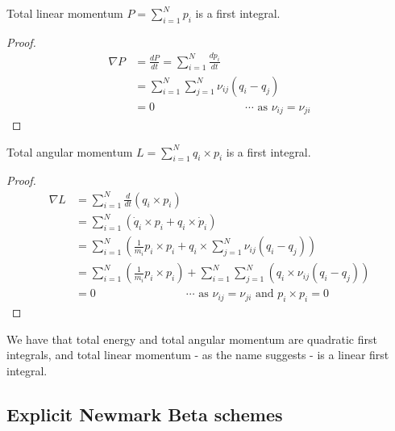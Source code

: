 \documentclass[../Main.tex]{subfiles}
\begin{document}
\begin{theorem} Total linear momentum $P = \sum_{i=1}^{N} p_{i}$ is a first integral. \end{theorem}
\begin{proof}
\begin{align*}
\nabla P & = \frac{dP}{dt} = \sum_{i=1}^{N} \frac{dp_{i}}{dt} \\
&=\sum_{i=1}^{N}\sum_{j=1}^{N}\nu_{ij}\left(q_{i} - q_{j}\right) \\
& = 0 \qquad \qquad \qquad \qquad \cdots \mbox{ as }\nu_{ij} = \nu_{ji}
\end{align*}
\end{proof} 

\begin{theorem} Total angular momentum $L = \sum_{i=1}^{N} q_{i} \times p_{i}$ is a first integral. \end{theorem}
\begin{proof}
\begin{align*}
\nabla L & = \sum_{i=1}^{N} \frac{d}{dt} \left(q_{i} \times p_{i}\right) \\
& = \sum_{i=1}^{N} \left(\dot{q}_{i} \times p_{i} + {q}_{i} \times \dot{p}_{i}\right) \\  
& = \sum_{i=1}^{N} \left( \frac{1}{m_{i}}p_{i} \times p_{i} + q_{i} \times \sum_{j=1}^{N}\nu_{ij}\left(q_{i} - q_{j}\right)\right) \\  
& = \sum_{i=1}^{N} \left( \frac{1}{m_{i}}p_{i} \times p_{i}\right) +  \sum_{i=1}^{N}\sum_{j=1}^{N} \left(q_{i} \times \nu_{ij}\left(q_{i} - q_{j}\right)\right) \\
& = 0  \qquad \qquad \qquad \qquad \cdots \mbox{ as }\nu_{ij} = \nu_{ji} \mbox{ and } p_{i} \times p_{i} = 0
\end{align*}
\end{proof}
 We have that total energy and total angular momentum are quadratic first integrals, and total linear momentum - as the name suggests - is a linear first integral.

\subsection{Explicit Newmark Beta schemes}
\end{document}
